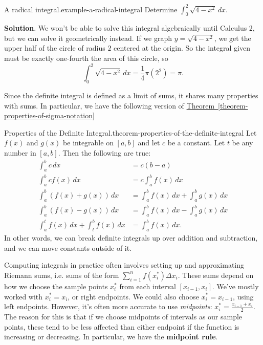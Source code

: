 \documentclass[10pt,]{book}
\newcommand{\terminology}[1]{\textbf{#1}}
\numberwithin{equation}{section}
\begin{document}
\begin{example}{A radical integral.}{example-a-radical-integral}%
\hypertarget{p-433}{}%
Determine \(\int_{0}^{2}\sqrt{4-x^{2}}\,dx\).%
\par\smallskip%
\noindent\textbf{Solution}.\hypertarget{solution-95}{}\quad%
\hypertarget{p-434}{}%
We won't be able to solve this integral algebraically until Calculus 2, but we can solve it geometrically instead. If we graph \(y = \sqrt{4-x^{2}}\), we get the upper half of the circle of radius \(2\) centered at the origin. So the integral given must be exactly one-fourth the area of this circle, so%
\begin{equation*}
\int_{0}^{2}\sqrt{4-x^{2}}\,dx = \frac{1}{4}\pi(2^{2}) = \pi.
\end{equation*}
%
\end{example}
\hypertarget{p-435}{}%
Since the definite integral is defined as a limit of sums, it shares many properties with sums. In particular, we have the following version of \hyperref[theorem-properties-of-sigma-notation]{Theorem~\ref{theorem-properties-of-sigma-notation}}%
\begin{theorem}{Properties of the Definite Integral.}{}{theorem-properties-of-the-definite-integral}%
\hypertarget{p-436}{}%
Let \(f(x)\) and \(g(x)\) be integrable on \([a,b]\) and let \(c\) be a constant. Let \(t\) be any number in \([a,b]\). Then the following are true:%
\begin{align*}
\int_{a}^{b}c\,dx & = c(b-a) \\
\int_{a}^{b}cf(x)\,dx & = c\int_{a}^{b}f(x)\,dx \\
\int_{a}^{b}(f(x)+g(x))\,dx & = \int_{a}^{b}f(x)\,dx + \int_{a}^{b}g(x)\,dx\\
\int_{a}^{b}(f(x) - g(x))\,dx & = \int_{a}^{b}f(x)\,dx - \int_{a}^{b}g(x)\,dx \\
\int_{a}^{t}f(x)\,dx + \int_{t}^{b}f(x)\,dx & = \int_{a}^{b}f(x)\,dx. 
\end{align*}
In other words, we can break definite integrals up over addition and subtraction, and we can move constants outside of it.%
\end{theorem}
\hypertarget{p-437}{}%
Computing integrals in practice often involves setting up and approximating Riemann sums, i.e. sums of the form \(\sum_{i=1}^{n}f(x_{i}^{*})\Delta x_{i}\). These sums depend on how we choose the sample points \(x_{i}^{*}\) from each interval \([x_{i-1},x_{i}]\). We've mostly worked with \(x_{i}^{*} = x_{i}\), or right endpoints. We could also choose \(x_{i}^{*} = x_{i-1}\), using left endpoints. However, it's often more accurate to use \emph{midpoints}: \(x_{i}^{*} = \frac{x_{i-1}+x_{i}}{2}\). The reason for this is that if we choose midpoints of intervals as our sample points, these tend to be less affected than either endpoint if the function is increasing or decreasing. In particular, we have the \terminology{midpoint rule}.%
\end{document}
